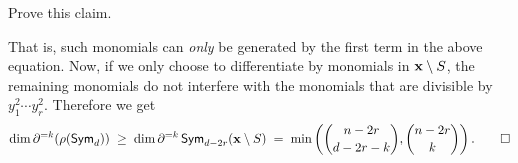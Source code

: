 \begin{exercise}
Prove this claim. 
\end{exercise}

That is, such monomials can \emph{only} be generated by the first term in the above equation. Now, if we only choose to differentiate by monomials in $\mathbf{x} \setminus S$, the remaining monomials do not interfere with the monomials that are divisible by $y_1^2 \cdots y_r^2$. Therefore we get
\[
  \dim \partial^{=k}(\rho(\operatorname{\mathsf{Sym}}_d)) \;\geq\; \dim \partial^{=k}\operatorname{\mathsf{Sym}}_{d-2r}(\mathbf{x} \setminus S) \;=\; \min\left(\binom{n-2r}{d-2r-k}, \binom{n-2r}{k}\right).\qed
\]








